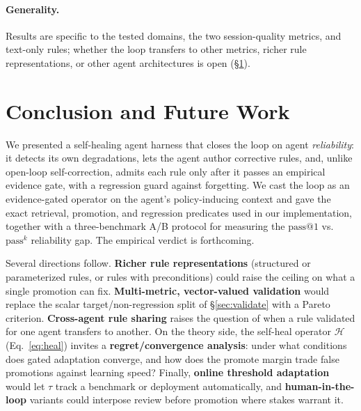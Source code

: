 \documentclass[letterpaper]{article} %
\makeatletter
\newcommand{\Heal}{\mathcal{H}}                   %
\newcommand{\passk}{\mathrm{pass}^{k}}
\newcommand{\passone}{\mathrm{pass@}1}
\makeatother
\begin{document}
\paragraph{Generality.} Results are specific to the tested domains, the two session-quality
metrics, and text-only rules; whether the loop transfers to other metrics, richer rule
representations, or other agent architectures is open (\S\ref{sec:conclusion}).

\section{Conclusion and Future Work}
\label{sec:conclusion}

We presented a self-healing agent harness that closes the loop on agent \emph{reliability}: it
detects its own degradations, lets the agent author corrective rules, and, unlike open-loop
self-correction, admits each rule only after it passes an empirical evidence gate, with a
regression guard against forgetting. We cast the loop as an evidence-gated operator on the
agent's policy-inducing context and gave the exact retrieval, promotion, and regression
predicates used in our implementation, together with a three-benchmark A/B protocol for
measuring the $\passone$ vs.\ $\passk$ reliability gap. The empirical verdict is forthcoming.

Several directions follow. \textbf{Richer rule representations} (structured or parameterized
rules, or rules with preconditions) could raise the ceiling on what a single promotion can
fix. \textbf{Multi-metric, vector-valued validation} would replace the scalar
target/non-regression split of \S\ref{sec:validate} with a Pareto criterion.
\textbf{Cross-agent rule sharing} raises the question of when a rule validated for one agent
transfers to another. On the theory side, the self-heal operator $\Heal$ (Eq.~\eqref{eq:heal})
invites a \textbf{regret/convergence analysis}: under what conditions does gated adaptation
converge, and how does the promote margin trade false promotions against learning speed?
Finally, \textbf{online threshold adaptation} would let $\tau$ track a benchmark or deployment
automatically, and \textbf{human-in-the-loop} variants could interpose review before promotion
where stakes warrant it.


\end{document}
